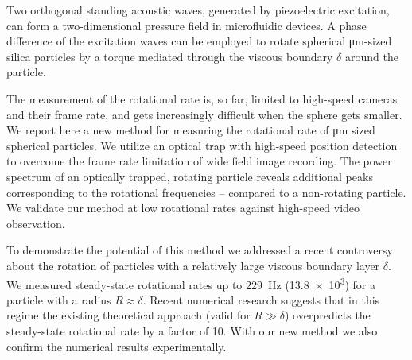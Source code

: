 Two orthogonal standing acoustic waves, generated by piezoelectric excitation, 
can form a two-dimensional pressure field in microfluidic devices. A phase 
difference of the excitation waves can be employed to rotate spherical 
\si{\micro\meter}-sized silica particles by a torque mediated through the 
viscous boundary $\delta$ around the particle.

The measurement of the rotational rate is, so far, limited to high-speed cameras 
and their frame rate, and gets increasingly difficult when the sphere gets 
smaller.  We report here a new method for measuring the rotational rate of 
\si{\micro\meter} sized spherical particles. We utilize an optical trap with 
high-speed position detection to overcome the frame rate limitation of wide 
field image recording. The power spectrum of an optically trapped, rotating 
particle reveals additional peaks corresponding to the rotational frequencies -- 
compared to a non-rotating particle. We validate our method at low rotational 
rates against high-speed video observation. 

To demonstrate the potential of this method we addressed a recent controversy 
about the rotation of particles with a relatively large viscous boundary layer 
$\delta$. We measured steady-state rotational rates up to \SI{229}{\hertz} 
(\SI{13.8e3}{\rpm}) for a particle with a radius $R \approx \delta$.  Recent 
numerical research suggests that in this regime the existing theoretical 
approach (valid for $R\gg\delta$) overpredicts the steady-state rotational rate 
by a factor of 10.  With our new method we also confirm the numerical results 
experimentally.
